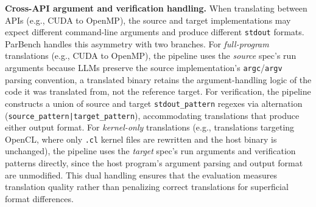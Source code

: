 
\textbf{Cross-API argument and verification handling.} When translating between APIs (e.g., CUDA to OpenMP), the source and target implementations may expect different command-line arguments and produce different \texttt{stdout} formats. ParBench handles this asymmetry with two branches. For \emph{full-program} translations (e.g., CUDA to OpenMP), the pipeline uses the \emph{source} spec's run arguments because LLMs preserve the source implementation's \texttt{argc}/\texttt{argv} parsing convention, a translated binary retains the argument-handling logic of the code it was translated from, not the reference target. For verification, the pipeline constructs a union of source and target \texttt{stdout\_pattern} regexes via alternation (\texttt{source\_pattern|target\_pattern}), accommodating translations that produce either output format. For \emph{kernel-only} translations (e.g., translations targeting OpenCL, where only \texttt{.cl} kernel files are rewritten and the host binary is unchanged), the pipeline uses the \emph{target} spec's run arguments and verification patterns directly, since the host program's argument parsing and output format are unmodified. This dual handling ensures that the evaluation measures translation quality rather than penalizing correct translations for superficial format differences.

